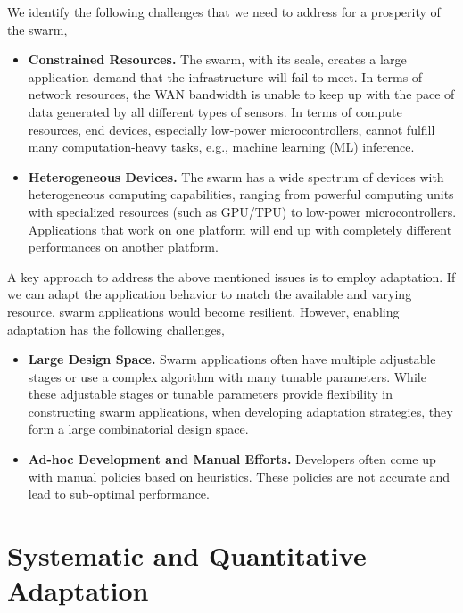 \documentclass[thesis.tex]{subfiles}
\begin{document}
We identify the following challenges that we need to address for a prosperity of
the swarm,

\begin{itemize}[topsep=5pt, itemsep=2pt]

\item \textbf{Constrained Resources.} The swarm, with its scale, creates a large
application demand that the infrastructure will fail to meet. In terms of
network resources, the WAN bandwidth is unable to keep up with the pace of data
generated by all different types of sensors. In terms of compute resources, end
devices, especially low-power microcontrollers, cannot fulfill many
computation-heavy tasks, e.g., machine learning (ML) inference.

\item \textbf{Heterogeneous Devices.} The swarm has a wide spectrum of devices with
heterogeneous computing capabilities, ranging from powerful computing units with
specialized resources (such as GPU/TPU) to low-power
microcontrollers. Applications that work on one platform will end up with
completely different performances on another platform.

\end{itemize}

A key approach to address the above mentioned issues is to employ adaptation. If
we can adapt the application behavior to match the available and varying
resource, swarm applications would become resilient. However, enabling
adaptation has the following challenges,

\begin{itemize}[topsep=5pt, itemsep=2pt]

\item \textbf{Large Design Space.} Swarm applications often have multiple
  adjustable stages or use a complex algorithm with many tunable
  parameters. While these adjustable stages or tunable parameters provide
  flexibility in constructing swarm applications, when developing adaptation
  strategies, they form a large combinatorial design space.

\item \textbf{Ad-hoc Development and Manual Efforts.} Developers often come up
  with manual policies based on heuristics. These policies are not accurate and
  lead to sub-optimal performance.

\end{itemize}

\section{Systematic and Quantitative Adaptation}
\label{sec:adaptation}
\end{document}

